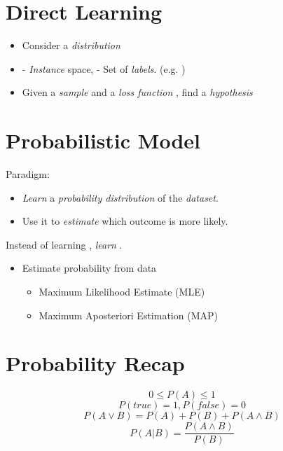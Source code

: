\documentclass[
	title={Na\:ive Bayes Learning}
]{cs584notes}
\begin{document}

\tableofcontents

\section{Direct Learning}\label{sec:direct-learning}
\begin{itemize}
	\item Consider a \emph{distribution} 
	\item {} - \emph{Instance} space,  - Set of \emph{labels}. (e.g. )
	\item Given a \emph{sample}  and a \emph{loss function} , find a \emph{hypothesis}
\end{itemize}

\section{Probabilistic Model}\label{sec:probabilistic-model}
Paradigm:
\begin{itemize}
	\item \emph{Learn} a \emph{probability distribution} of the \emph{dataset}.
	\item Use it to \emph{estimate} which outcome is more likely.
\end{itemize}

Instead of learning , \emph{learn} .

\begin{itemize}
	\item Estimate probability from data
	\begin{itemize}
		\item Maximum Likelihood Estimate (MLE)
		\item Maximum Aposteriori Estimation (MAP)
	\end{itemize}
\end{itemize}

\section{Probability Recap}\label{sec:probability-recap}
\[ 0 \leq P(A) \leq 1 \]
\[ P(true) = 1, P(false) = 0 \]
\[ P(A \lor B) = P(A) + P(B) + P(A \land B) \]
\[ P(A|B) = \frac{P(A\land B)}{{P(B)}} \]
\end{document}

